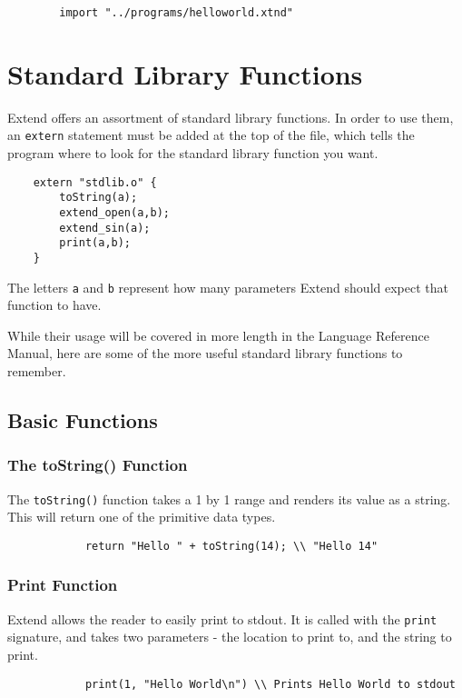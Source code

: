 	\begin{lstlisting}
		import "../programs/helloworld.xtnd"
	\end{lstlisting}


\section{Standard Library Functions}
Extend offers an assortment of standard library functions. In order to use them, an \texttt{extern} statement must be added at the top of the file, which tells the program where to look for the standard library function you want.

\begin{lstlisting}
	extern "stdlib.o" {
		toString(a);
		extend_open(a,b);
		extend_sin(a);
		print(a,b);
	}
\end{lstlisting}

\medskip \noindent
The letters \texttt{a} and \texttt{b} represent how many parameters Extend should expect that function to have.

While their usage will be covered in more length in the Language Reference Manual, here are some of the more useful standard library functions to remember.
	\subsection{Basic Functions}
		\subsubsection{The toString() Function}
		The \texttt{toString()} function takes a 1 by 1 range and renders its value as a string. This will return one of the primitive data types.

		\begin{lstlisting}
			return "Hello " + toString(14); \\ "Hello 14"
		\end{lstlisting}

		\subsubsection{Print Function}
		Extend allows the reader to easily print to stdout. It is called with the \texttt{print} signature, and takes two parameters - the location to print to, and the string to print.

		\begin{lstlisting}
			print(1, "Hello World\n") \\ Prints Hello World to stdout
		\end{lstlisting}

